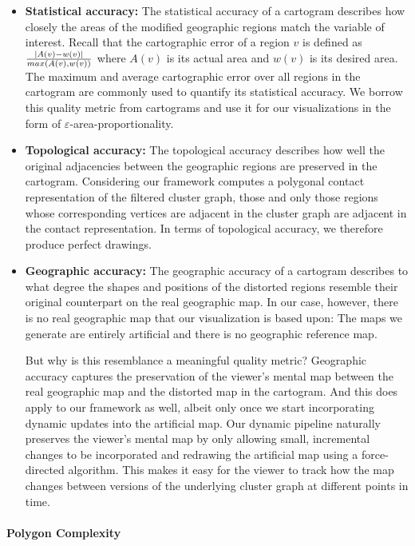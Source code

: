 \begin{itemize}
\item \textbf{Statistical accuracy:}
The statistical accuracy of a cartogram describes how closely the areas of the modified geographic regions match the variable of interest.
Recall that the cartographic error of a region $v$ is defined as $\frac{\left\lvert A(v)-w(v)\right\rvert}{max(A(v),w(v))}$ where $A(v)$ is its actual area and $w(v)$ is its desired area.
The maximum and average cartographic error over all regions in the cartogram are commonly used to quantify its statistical accuracy.
We borrow this quality metric from cartograms and use it for our visualizations in the form of $\varepsilon$-area-proportionality.

\item \textbf{Topological accuracy:}
The topological accuracy describes how well the original adjacencies between the geographic regions are preserved in the cartogram.
Considering our framework computes a polygonal contact representation of the filtered cluster graph, those and only those regions whose corresponding vertices are adjacent in the cluster graph are adjacent in the contact representation.
In terms of topological accuracy, we therefore produce perfect drawings.

\item \textbf{Geographic accuracy:}
The geographic accuracy of a cartogram describes to what degree the shapes and positions of the distorted regions resemble their original counterpart on the real geographic map.
In our case, however, there is no real geographic map that our visualization is based upon:
The maps we generate are entirely artificial and there is no geographic reference map.

But why is this resemblance a meaningful quality metric?
Geographic accuracy captures the preservation of the viewer's mental map between the real geographic map and the distorted map in the cartogram.
And this does apply to our framework as well, albeit only once we start incorporating dynamic updates into the artificial map.
Our dynamic pipeline naturally preserves the viewer's mental map by only allowing small, incremental changes to be incorporated and redrawing the artificial map using a force-directed algorithm.
This makes it easy for the viewer to track how the map changes between versions of the underlying cluster graph at different points in time.
\end{itemize}



\paragraph{Polygon Complexity}

